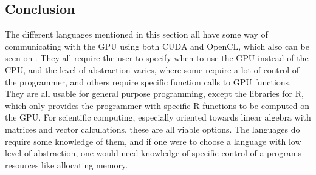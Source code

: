  

\subsection{Conclusion}  

The different languages mentioned in this section all have some way of communicating with the GPU using both CUDA and OpenCL, which also can be seen on  .
They all require the user to specify when to use the GPU instead of the CPU, and the level of abstraction varies, where some require a lot of control of the programmer, and others require specific function calls to GPU functions.
They are all usable for general purpose programming, except the libraries for R, which only provides the programmer with specific R functions to be computed on the GPU.
For scientific computing, especially oriented towards linear algebra with matrices and vector calculations, these are all viable options.
The languages do require some knowledge of them, and if one were to choose a language with low level of abstraction, one would need knowledge of specific control of a programs resources like allocating memory.

                     